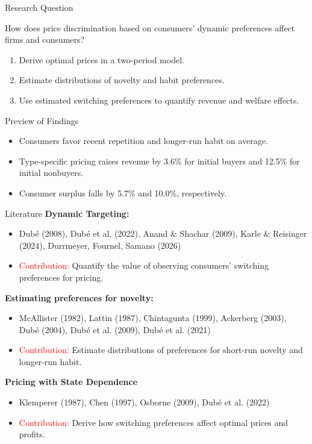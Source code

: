 \documentclass[aspectratio=169,professionalfonts]{beamer}
\newcommand{\shortbuttons}{}
\begin{document}
\begin{frame}[label=short-2]{Research Question} 
  \begin{tcolorbox}
    How does price discrimination based on consumers' dynamic preferences affect firms and consumers?
  \end{tcolorbox}
  \begin{enumerate}
    \item Derive optimal prices in a two-period model.
    \item Estimate distributions of novelty and habit preferences.
    \item Use estimated switching preferences to quantify revenue and welfare effects.
  \end{enumerate}
\end{frame}

\begin{frame}{Preview of Findings}
  \begin{itemize}
    \item Consumers favor recent repetition and longer-run habit on average.
    \item Type-specific pricing raises revenue by 3.6\% for initial buyers and 12.5\% for initial nonbuyers.
    \item Consumer surplus falls by 5.7\% and 10.0\%, respectively.
  \end{itemize}
\end{frame}
\gdef\shortbuttons{}
\begin{frame}[label=short-3]{Literature}
  \footnotesize
  \textbf{Dynamic Targeting:}
    \begin{itemize}\setlength{\itemsep}{2pt}\setlength{\parsep}{0pt}\setlength{\parskip}{0pt}
      \item Dub\'e (2008), Dub\'e et al. (2022), Anand \& Shachar (2009), Karle \& Reisinger (2024), Durrmeyer, Fournel, Samano (2026)
      \item \textcolor{red}{Contribution:} Quantify the value of observing consumers' switching preferences for pricing.
    \end{itemize}
  \textbf{Estimating preferences for novelty:}
  \begin{itemize}\setlength{\itemsep}{2pt}\setlength{\parsep}{0pt}\setlength{\parskip}{0pt}
      \item McAllister (1982), Lattin (1987), Chintagunta (1999), Ackerberg (2003), Dub\'e (2004), Dub\'e et al. (2009), Dub\'e et al. (2021)
      \item \textcolor{red}{Contribution:} Estimate distributions of preferences for short-run novelty and longer-run habit.
  \end{itemize}
  \textbf{Pricing with State Dependence}
  \begin{itemize}\setlength{\itemsep}{2pt}\setlength{\parsep}{0pt}\setlength{\parskip}{0pt}
    \item Klemperer (1987), Chen (1997), Osborne (2009), Dub\'e et al. (2022)
    \item \textcolor{red}{Contribution:} Derive how switching preferences affect optimal prices and profits.
  \end{itemize}
\end{frame}
\end{document}

